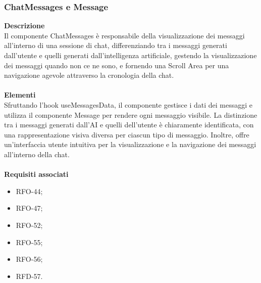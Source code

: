 \subsubsection{ChatMessages e Message}
\textbf{Descrizione}\\
Il componente ChatMessages è responsabile della visualizzazione dei messaggi all'interno di una sessione di chat, differenziando tra i messaggi generati dall'utente e quelli generati dall'intelligenza artificiale, gestendo la visualizzazione dei messaggi quando non ce ne sono, e fornendo una Scroll Area per una navigazione agevole attraverso la cronologia della chat.\\ \\
\textbf{Elementi}\\
Sfruttando l'hook useMessagesData, il componente gestisce i dati dei messaggi e utilizza il componente Message per rendere ogni messaggio visibile. La distinzione tra i messaggi generati dall'AI e quelli dell'utente è chiaramente identificata, con una rappresentazione visiva diversa per ciascun tipo di messaggio. Inoltre, offre un'interfaccia utente intuitiva per la visualizzazione e la navigazione dei messaggi all'interno della chat.\\ \\
\textbf{Requisiti associati}
\begin{itemize}[itemsep=-4pt]
    \item RFO-44;
    \item RFO-47;
    \item RFO-52;
    \item RFO-55;
    \item RFO-56;
    \item RFD-57.
\end{itemize}

\newpage
